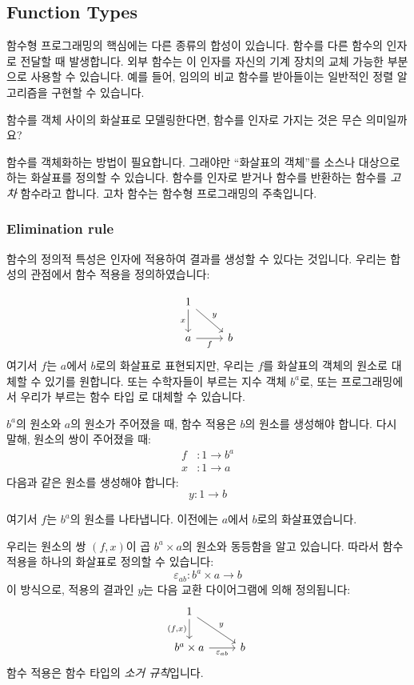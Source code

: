 \documentclass[DaoFP]{subfiles}
\begin{document}
\begin{CJK*}{UTF8}{gbsn}
\setcounter{chapter}{5}

\chapter{Function Types}

함수형 프로그래밍의 핵심에는 다른 종류의 합성이 있습니다. 함수를 다른 함수의 인자로 전달할 때 발생합니다. 외부 함수는 이 인자를 자신의 기계 장치의 교체 가능한 부분으로 사용할 수 있습니다. 예를 들어, 임의의 비교 함수를 받아들이는 일반적인 정렬 알고리즘을 구현할 수 있습니다.

함수를 객체 사이의 화살표로 모델링한다면, 함수를 인자로 가지는 것은 무슨 의미일까요?

함수를 객체화하는 방법이 필요합니다. 그래야만 ``화살표의 객체''를 소스나 대상으로 하는 화살표를 정의할 수 있습니다. 함수를 인자로 받거나 함수를 반환하는 함수를 \emph{고차} 함수라고 합니다. 고차 함수는 함수형 프로그래밍의 주축입니다.

\subsection{Elimination rule}

함수의 정의적 특성은 인자에 적용하여 결과를 생성할 수 있다는 것입니다. 우리는 합성의 관점에서 함수 적용을 정의하였습니다:

\[
 \begin{tikzcd}
 1
 \arrow[d, "x"']
 \arrow[rd, "y"]
 \\
 a
 \arrow[r, "f"']
& b
 \end{tikzcd}
\]
여기서 $f$는 $a$에서 $b$로의 화살표로 표현되지만, 우리는 $f$를 화살표의 객체의 원소로 대체할 수 있기를 원합니다. 또는 수학자들이 부르는 지수 객체 $b^a$로, 또는 프로그래밍에서 우리가 부르는 함수 타입 로 대체할 수 있습니다.

$b^a$의 원소와 $a$의 원소가 주어졌을 때, 함수 적용은 $b$의 원소를 생성해야 합니다. 다시 말해, 원소의 쌍이 주어졌을 때:
\begin{align*}
f &\colon 1 \to b^a \\
x &\colon 1 \to a
\end{align*}
다음과 같은 원소를 생성해야 합니다:
\[y \colon 1 \to b \]

여기서 $f$는 $b^a$의 원소를 나타냅니다. 이전에는 $a$에서 $b$로의 화살표였습니다.

우리는 원소의 쌍 $(f, x)$이 곱 $b^a \times a$의 원소와 동등함을 알고 있습니다. 따라서 함수 적용을 하나의 화살표로 정의할 수 있습니다:
\[\varepsilon_{a b} \colon b^a \times a \to b\]
이 방식으로, 적용의 결과인 $y$는 다음 교환 다이어그램에 의해 정의됩니다:
\[
 \begin{tikzcd}
 1
 \arrow[d, "{(f, x)}"']
 \arrow[rd, "y"]
 \\
 b^a \times a
 \arrow[r, "\varepsilon_{a b}"']
& b
 \end{tikzcd}
\]
함수 적용은 함수 타입의 \emph{소거 규칙}입니다.


\end{CJK*}
\end{document}
